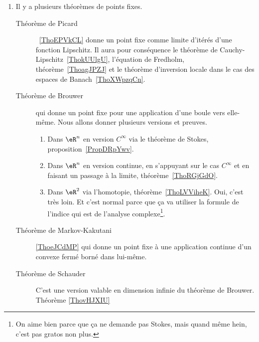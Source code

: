 
        \label{THEMEooWAYJooUSnmMh}
\begin{enumerate}
	\item
	      Il y a plusieurs théorèmes de points fixes.
	      \begin{description}
		      \item[Théorème de Picard]~\ref{ThoEPVkCL} donne un point fixe comme limite d'itérés d'une fonction Lipschitz. Il aura pour conséquence le théorème de Cauchy-Lipschitz~\ref{ThokUUlgU}, l'équation de Fredholm, théorème~\ref{ThoagJPZJ} et le théorème d'inversion locale dans le cas des espaces de Banach~\ref{ThoXWpzqCn}.
		      \item[Théorème de Brouwer] qui donne un point fixe pour une application d'une boule vers elle-même. Nous allons donner plusieurs versions et preuves.
		            \begin{enumerate}
			            \item
			                  Dans \( \eR^n\) en version \( C^{\infty}\) via le théorème de Stokes, proposition~\ref{PropDRpYwv}.
			            \item
			                  Dans \( \eR^n\) en version continue, en s'appuyant sur le cas \( C^{\infty}\) et en faisant un passage à la limite, théorème~\ref{ThoRGjGdO}.
			            \item
			                  Dans \( \eR^2\) via l'homotopie, théorème~\ref{ThoLVViheK}. Oui, c'est très loin. Et c'est normal parce que ça va utiliser la formule de l'indice qui est de l'analyse complexe\footnote{On aime bien parce que ça ne demande pas Stokes, mais quand même hein, c'est pas gratos non plus.}.
		            \end{enumerate}
		      \item[Théorème de Markov-Kakutani]\ref{ThoeJCdMP} qui donne un point fixe à une application continue d'un convexe fermé borné dans lui-même.
		      \item[Théorème de Schauder] C'est une version valable en dimension infinie du théorème de Brouwer. Théorème \ref{ThovHJXIU}
	      \end{description}


\end{enumerate}
